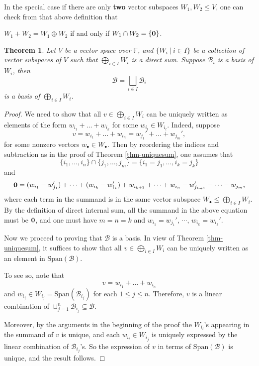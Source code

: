 \documentclass[11pt,openany]{book}
\theoremstyle{plain}
\newtheorem{theorem}{Theorem}[chapter]
\theoremstyle{definition}
\theoremstyle{remark}
\begin{document}
\smallskip
In the special case if there are only {\bf two} vector subspaces $W_1, W_2 \leq V$, one can check from that above definition that
\begin{center}
$W_1 + W_2 = W_1 \oplus W_2$ \quad if and only if \quad $W_1 \cap W_2 = \{\bf 0\}$. 
\end{center}
\begin{theorem}
    Let $V$ be a vector space over $\mathbb{F}$, and $\{W_i\ |\ i \in I\}$ be a collection of vector subspaces of $V$ such that
    $\bigoplus_{i \in I} W_i$ is a direct sum. Suppose $\mathcal{B}_i$ is a basis of $W_i$, then $$\mathcal{B} = \bigsqcup_{i\in I} \mathcal{B}_i$$ is a basis of $\bigoplus_{i \in I} W_i$.
\end{theorem}
\begin{proof}
We need to show that all $v \in \bigoplus_{i \in I} W_i$ can be uniquely written as elements of the form $w_{i_1} + \dots + w_{i_k}$ for some $w_{i_l} \in W_{i_l}$. Indeed, suppose 
$$v = w_{i_1} + \dots + w_{i_n} = w_{j_1}' + \dots + w_{j_m}',$$
for some nonzero vectors $w_{\bullet} \in W_{\bullet}$. Then by reordering the indices and subtraction as in the proof of Theorem \ref{thm-uniquesum}, one assumes 
that 
$$\{i_1, \dots, i_n\} \cap \{j_1, \dots, j_m\} = \{i_1 = j_1, \dots, i_k = j_k\}$$ 
and
$${\bf 0} = (w_{i_1}-w_{j_1}') + \dots + (w_{i_k}-w_{i_k}') + w_{i_{k+1}} + \dots + w_{i_n} - w_{j_{k+1}}' - \dots - w_{j_m},$$
where each term in the summand is in the same vector subspace $W_{\bullet} \leq \bigoplus_{i \in I} W_i$. By the definition of direct internal sum, all the summand in the above equation must be ${\bf 0}$, and one must have
$m = n = k$ and $w_{i_1} = w_{j_1}'$, $\cdots$, $w_{i_k} = w_{i_k}'$.

Now we proceed to proving that $\mathcal{B}$ is a basis. In view of Theorem \ref{thm-uniquesum}, it suffices to show that all $v \in \bigoplus_{i \in I} W_i$ can be uniquely written as an element in $\mathrm{Span}(\mathcal{B})$. 

To see so, note that 
$$v = w_{i_1} + \dots + w_{i_n}$$
and $w_{i_j} \in W_{i_j} = \mathrm{Span}(\mathcal{B}_{i_j})$ for each $1 \leq j \leq n$. Therefore, $v$ is a linear combination of $\sqcup_{j = 1}^n \mathcal{B}_{i_j} \subseteq \mathcal{B}$.

Moreover, by the arguments in the beginning of the proof the $W_{i_l}$'s appearing in the summand of $v$ is unique, and each $w_{i_l} \in W_{i_j}$ is uniquely expressed by the linear combination of $\mathcal{B}_{i_j}$'s. So the expression of $v$ in terms of $\mathrm{Span}(\mathcal{B})$ is unique, and the result follows.
\end{proof}
\end{document}
